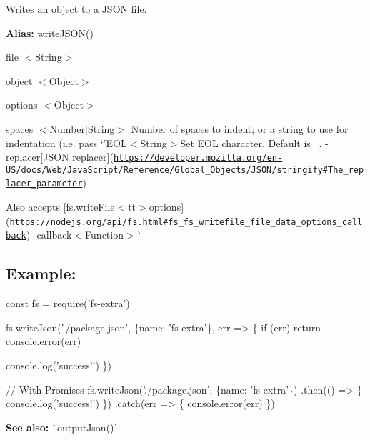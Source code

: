 Writes an object to a J\+S\+ON file.

{\bfseries Alias\+:} {\ttfamily write\+J\+S\+O\+N()}


\begin{DoxyItemize}
\item {\ttfamily file} {\ttfamily $<$String$>$}
\item {\ttfamily object} {\ttfamily $<$Object$>$}
\item {\ttfamily options} {\ttfamily $<$Object$>$}
\begin{DoxyItemize}
\item {\ttfamily spaces} {\ttfamily $<$Number$\vert$\+String$>$} Number of spaces to indent; or a string to use for indentation (i.\+e. pass `'E\+O\+L$<$\+String$>${\ttfamily Set E\+OL character. Default is}~\newline
{\ttfamily . -\/}replacer{\ttfamily \mbox{[}J\+S\+ON replacer\mbox{]}(\href{https://developer.mozilla.org/en-US/docs/Web/JavaScript/Reference/Global_Objects/JSON/stringify#The_replacer_parameter}{\tt https\+://developer.\+mozilla.\+org/en-\/\+U\+S/docs/\+Web/\+Java\+Script/\+Reference/\+Global\+\_\+\+Objects/\+J\+S\+O\+N/stringify\#\+The\+\_\+replacer\+\_\+parameter})}
\item {\ttfamily Also accepts \mbox{[}}fs.\+write\+File$<$tt$>$options\mbox{]}(\href{https://nodejs.org/api/fs.html#fs_fs_writefile_file_data_options_callback}{\tt https\+://nodejs.\+org/api/fs.\+html\#fs\+\_\+fs\+\_\+writefile\+\_\+file\+\_\+data\+\_\+options\+\_\+callback}) -\/callback$<$\+Function$>$\`{}
\end{DoxyItemize}
\end{DoxyItemize}

\subsection*{Example\+:}


\begin{DoxyCode}
const fs = require('fs-extra')

fs.writeJson('./package.json', \{name: 'fs-extra'\}, err => \{
  if (err) return console.error(err)

  console.log('success!')
\})

// With Promises
fs.writeJson('./package.json', \{name: 'fs-extra'\})
.then(() => \{
  console.log('success!')
\})
.catch(err => \{
  console.error(err)
\})
\end{DoxyCode}
 



{\bfseries See also\+:} \`{}output\+Json()\`{} 